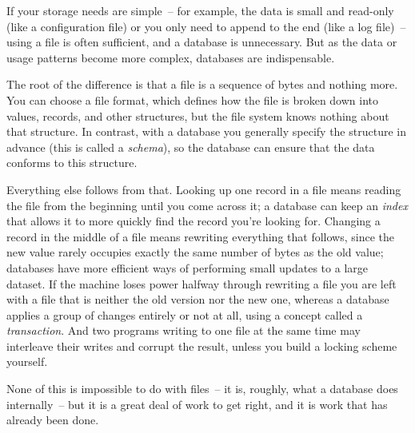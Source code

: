 If your storage needs are simple~-- for example, the data is small and read-only (like a configuration file) or you only need to append to the end (like a log file)~-- using a file is often sufficient, and a database is unnecessary.
But as the data or usage patterns become more complex, databases are indispensable.

The root of the difference is that a file is a sequence of bytes and nothing more.
You can choose a file format, which defines how the file is broken down into values, records, and other structures, but the file system knows nothing about that structure.
In contrast, with a database you generally specify the structure in advance (this is called a \emph{schema}), so the database can ensure that the data conforms to this structure.

Everything else follows from that.
Looking up one record in a file means reading the file from the beginning until you come across it; a database can keep an \emph{index} that allows it to more quickly find the record you're looking for.
Changing a record in the middle of a file means rewriting everything that follows, since the new value rarely occupies exactly the same number of bytes as the old value; databases have more efficient ways of performing small updates to a large dataset.
If the machine loses power halfway through rewriting a file you are left with a file that is neither the old version nor the new one, whereas a database applies a group of changes entirely or not at all, using a concept called a \emph{transaction}.
And two programs writing to one file at the same time may interleave their writes and corrupt the result, unless you build a locking scheme yourself.

None of this is impossible to do with files~-- it is, roughly, what a database does internally~-- but it is a great deal of work to get right, and it is work that has already been done.

